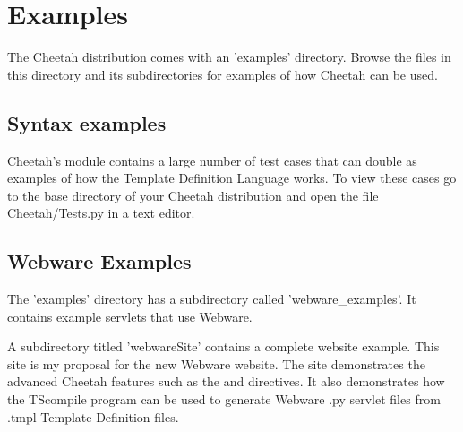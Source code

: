 \section{Examples}
\label{examples}

The Cheetah distribution comes with an 'examples' directory.  Browse the
files in this directory and its subdirectories for examples of how
Cheetah can be used.

\subsection{Syntax examples}
Cheetah's  module contains a large number of test cases
that can double as examples of how the Template Definition Language works.
To view these cases go to the base directory of your Cheetah distribution
and open the file Cheetah/Tests.py in a text editor.


\subsection{Webware Examples}
The 'examples' directory has a subdirectory called 'webware_examples'.  It
contains example servlets that use Webware.  

A subdirectory titled 'webwareSite' contains a complete website example. This
site is my proposal for the new Webware website.  The site demonstrates the
advanced Cheetah features such as the  and 
directives.  It also demonstrates how the TScompile program can be used to
generate Webware .py servlet files from .tmpl Template Definition files.

